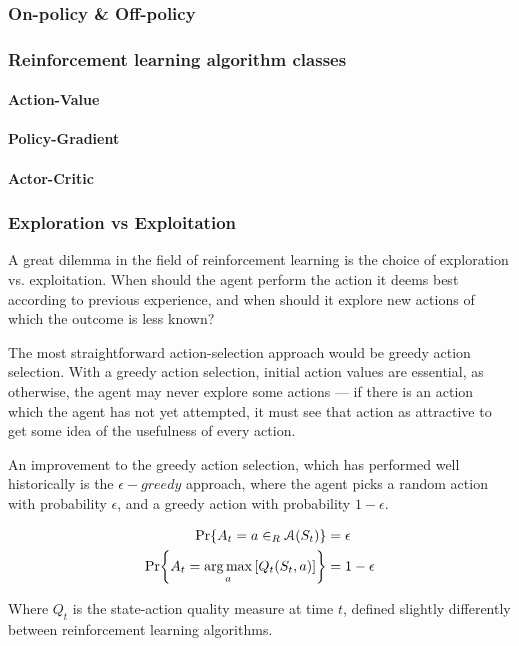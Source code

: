 \subsubsection{On-policy \& Off-policy}


\subsubsection{Reinforcement learning algorithm classes}
\paragraph{Action-Value}
\paragraph{Policy-Gradient}
\paragraph{Actor-Critic}


\subsubsection{Exploration vs Exploitation}
A great dilemma in the field of reinforcement learning is the choice of exploration vs. exploitation. 
When should the agent perform the action it deems best according to previous experience, and when should it explore new actions of which the outcome is less known? 

The most straightforward action-selection approach would be greedy action selection. With a greedy action selection, initial action values are essential, as otherwise, the agent may never explore some actions --- if there is an action which the agent has not yet attempted, it must see that action as attractive to get some idea of the usefulness of every action. 

An improvement to the greedy action selection, which has performed well historically is the $\epsilon-greedy$ approach, where the agent picks a random action with probability $\epsilon$, and a greedy action with probability $1-\epsilon$.

\begin{align}
    {{\rm Pr\!}\left\{A_t = a \in_R \ensuremath{\mathcal{A}}(S_t)\right\}} &= \epsilon\\
    {{\rm Pr\!}\left\{A_t = \operatorname*{arg\,max}_a \left[Q_t(S_t,a)\right]\right\}} &= 1-\epsilon
\end{align}

Where $Q_t$ is the state-action quality measure at time $t$, defined slightly differently between reinforcement learning algorithms.